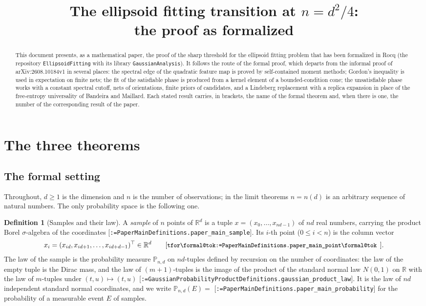\documentclass[11pt]{article}
\title{The ellipsoid fitting transition at $n = d^2/4$:\\ the proof as formalized}
\author{}
\date{}
\makeatletter
\newcommand{\formal@break}[1]{\@tfor\formal@tok:=#1\do{%
  \formal@tok
  \expandafter\ifx\formal@tok.\allowbreak\else
  \expandafter\ifx\formal@tok\_\allowbreak\fi\fi}}
\DeclareRobustCommand{\formal}[1]{\textnormal{[\texttt{\small\formal@break{#1}}]}}
\newcommand{\R}{\mathbb{R}}
\newcommand{\Prob}{\mathbb{P}}
\theoremstyle{plain}
\theoremstyle{definition}
\newtheorem{definition}[theorem]{Definition}
\makeatother
\begin{document}
\maketitle

\begin{abstract}
This document presents, as a mathematical paper, the proof of the sharp
threshold for the ellipsoid fitting problem that has been formalized in
Rocq (the repository \texttt{EllipsoidFitting} with its library
\texttt{GaussianAnalysis}). It follows the route of the formal proof,
which departs from the informal proof of arXiv:2608.10184v1 in several
places: the spectral edge of the quadratic feature map is proved by
self-contained moment methods; Gordon's inequality is used in expectation
on finite nets; the fit of the satisfiable phase is produced from a kernel
element of a bounded-condition cone; the unsatisfiable phase works with a
constant spectral cutoff, nets of orientations, finite priors of
candidates, and a Lindeberg replacement with a replica expansion in place
of the free-entropy universality of Bandeira and Maillard. Each stated
result carries, in brackets, the name of the formal theorem and, when
there is one, the number of the corresponding result of the paper.
\end{abstract}

\tableofcontents

\section{The three theorems}\label{sec:main}

\subsection{The formal setting}

Throughout, $d \ge 1$ is the dimension and $n$ is the number of
observations; in the limit theorems $n = n(d)$ is an arbitrary sequence of
natural numbers. The only probability space is the following one.

\begin{definition}[Samples and their law]\label{def:sample}
A \emph{sample} of $n$ points of $\R^d$ is a tuple
$x = (x_0, \dots, x_{nd - 1})$ of $nd$ real numbers, carrying the product
Borel $\sigma$-algebra of the coordinates
\formal{PaperMainDefinitions.paper\_main\_sample}. Its $i$-th point
($0 \le i < n$) is the column vector
\[
x_i = (x_{id}, x_{id + 1}, \dots, x_{id + d - 1})^{\top} \in \R^d
\tag*{\formal{PaperMainDefinitions.paper\_main\_point}.}
\]
The law of the sample is the probability measure $\Prob_{n, d}$ on
$nd$-tuples defined by recursion on the number of coordinates: the law of
the empty tuple is the Dirac mass, and the law of $(m+1)$-tuples is the
image of the product of the standard normal law $N(0, 1)$ on $\R$ with the
law of $m$-tuples under $(t, u) \mapsto (t, u)$
\formal{GaussianProbabilityProductDefinitions.gaussian\_product\_law}. It
is the law of $nd$ independent standard normal coordinates, and we write
$\Prob_{n,d}(E) = $ \formal{PaperMainDefinitions.paper\_main\_probability}
for the probability of a measurable event $E$ of samples.
\end{definition}
\end{document}
